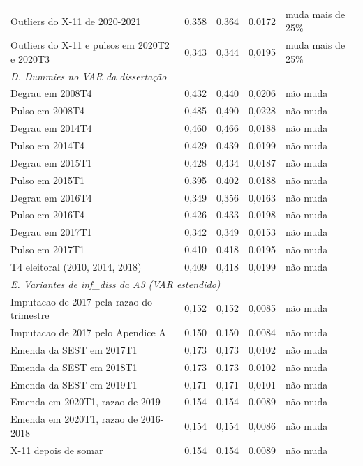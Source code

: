 \begin{table}[htbp]
\begin{tabular}{lcccl}
Outliers do X-11 de 2020-2021 & 0{,}358 & 0{,}364 & 0{,}0172 & muda mais de 25\% \\
Outliers do X-11 e pulsos em 2020T2 e 2020T3 & 0{,}343 & 0{,}344 & 0{,}0195 & muda mais de 25\% \\
\midrule
\multicolumn{5}{l}{\textit{D. Dummies no VAR da disserta\c{c}\~ao}} \\
Degrau em 2008T4 & 0{,}432 & 0{,}440 & 0{,}0206 & n\~ao muda \\
Pulso em 2008T4 & 0{,}485 & 0{,}490 & 0{,}0228 & n\~ao muda \\
Degrau em 2014T4 & 0{,}460 & 0{,}466 & 0{,}0188 & n\~ao muda \\
Pulso em 2014T4 & 0{,}429 & 0{,}439 & 0{,}0199 & n\~ao muda \\
Degrau em 2015T1 & 0{,}428 & 0{,}434 & 0{,}0187 & n\~ao muda \\
Pulso em 2015T1 & 0{,}395 & 0{,}402 & 0{,}0188 & n\~ao muda \\
Degrau em 2016T4 & 0{,}349 & 0{,}356 & 0{,}0163 & n\~ao muda \\
Pulso em 2016T4 & 0{,}426 & 0{,}433 & 0{,}0198 & n\~ao muda \\
Degrau em 2017T1 & 0{,}342 & 0{,}349 & 0{,}0153 & n\~ao muda \\
Pulso em 2017T1 & 0{,}410 & 0{,}418 & 0{,}0195 & n\~ao muda \\
T4 eleitoral (2010, 2014, 2018) & 0{,}409 & 0{,}418 & 0{,}0199 & n\~ao muda \\
\midrule
\multicolumn{5}{l}{\textit{E. Variantes de inf\_diss da A3 (VAR estendido)}} \\
Imputacao de 2017 pela razao do trimestre & 0{,}152 & 0{,}152 & 0{,}0085 & n\~ao muda \\
Imputacao de 2017 pelo Apendice A & 0{,}150 & 0{,}150 & 0{,}0084 & n\~ao muda \\
Emenda da SEST em 2017T1 & 0{,}173 & 0{,}173 & 0{,}0102 & n\~ao muda \\
Emenda da SEST em 2018T1 & 0{,}173 & 0{,}173 & 0{,}0102 & n\~ao muda \\
Emenda da SEST em 2019T1 & 0{,}171 & 0{,}171 & 0{,}0101 & n\~ao muda \\
Emenda em 2020T1, razao de 2019 & 0{,}154 & 0{,}154 & 0{,}0089 & n\~ao muda \\
Emenda em 2020T1, razao de 2016-2018 & 0{,}154 & 0{,}154 & 0{,}0086 & n\~ao muda \\
X-11 depois de somar & 0{,}154 & 0{,}154 & 0{,}0089 & n\~ao muda \\

\end{tabular}
\end{table}
